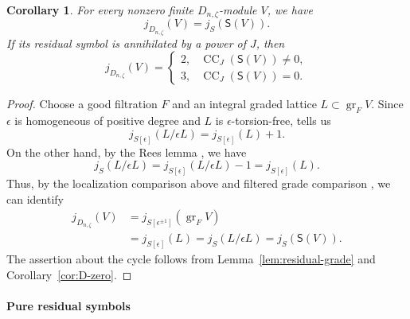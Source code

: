 \documentclass[11pt]{article}
\newtheorem{corollary}[theorem]{Corollary}
\theoremstyle{definition}
\newcommand{\gr}{\operatorname{gr}}
\newcommand{\CC}{\operatorname{CC}}
\begin{document}
\begin{corollary}\label{cor:quaternionic-grade}
For every nonzero finite $D_{n,\zeta}$-module $V$, we have
\[
 j_{D_{n,\zeta}}(V)=j_S(\mathsf S(V)).
\]
If its residual symbol is annihilated by a power of $J$, then
\[
 j_{D_{n,\zeta}}(V)=
 \begin{cases}
 2,&\CC_J(\mathsf S(V))\ne0,\\
 3,&\CC_J(\mathsf S(V))=0.
 \end{cases}
\]
\end{corollary}\begin{proof}
Choose a good filtration $F$ and an integral graded lattice
$L\subset\gr_FV$. Since $\epsilon$ is homogeneous of positive
degree and $L$ is $\epsilon$-torsion-free,
\cite[Corollary~4.4]{Levasseur1992} tells us
\[
 j_{S[\epsilon]}(L/\epsilon L)=j_{S[\epsilon]}(L)+1.
\]
On the other hand, by the Rees lemma \cite[Proposition~3.4(b)]{Levasseur1992},
we have
\[
 j_S(L/\epsilon L)
 =j_{S[\epsilon]}(L/\epsilon L)-1
 =j_{S[\epsilon]}(L).
\]
Thus, by the localization comparison above and filtered grade comparison
\cite[Chapter~III, Theorem~2.5.2]{LvO96}, we can identify
\[
 \begin{aligned}
 j_{D_{n,\zeta}}(V)
 &=j_{S[\epsilon^{\pm1}]}(\gr_FV)\\
 &=j_{S[\epsilon]}(L)
 =j_S(L/\epsilon L)
 =j_S(\mathsf S(V)).
 \end{aligned}
\]
The assertion about the cycle follows from Lemma~\ref{lem:residual-grade} and Corollary~\ref{cor:D-zero}.
\end{proof}

\paragraph{Pure residual symbols}
\end{document}
